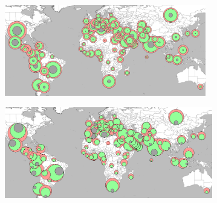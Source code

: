 \documentclass{beamer}
\begin{document}
\begin{frame}
\begin{figure}[!t]
  \centering
  \includegraphics[height=4cm]{MinMinAbsEval.png}
\end{figure}
\begin{figure}[!t]
  \centering
  \includegraphics[height=4cm]{HawaiianEval}
\end{figure}



\end{frame}
\end{document}
